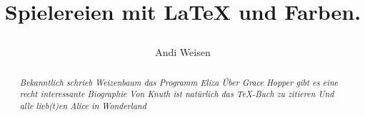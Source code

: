 \documentclass[DIV=calc,10pt,parskip=half,twocolumn]{scrartcl}
\author{Andi Weisen}
\begin{document}
\title{
\vspace{-1.5em}
\begin{tcolorbox}[colframe=meerblau,top=12pt,bottom=12pt,colback=meerblau,sharp corners,halign=center]
  \popp\fontsize{40pt}{46pt}\selectfont\color{himmelblau}Spiel{\color{gelb}ereien} {\color{flieder} mit} \LaTeX{} und {\color{mint}Farben}.
\end{tcolorbox}  
\vspace{-2.5em}
}
\author{}
\date{}


\maketitle

\begin{abstract}\itshape %
  \color{seagreen}
  Bekanntlich schrieb \glqq Weizenbaum\grqq{} das Programm Eliza
Über Grace Hopper gibt es eine recht interessante Biographie
Von Knuth ist natürlich das \TeX{}-Buch zu zitieren
Und alle lieb(t)en \emph{Alice in Wonderland}
\end{abstract} 
\end{document}
